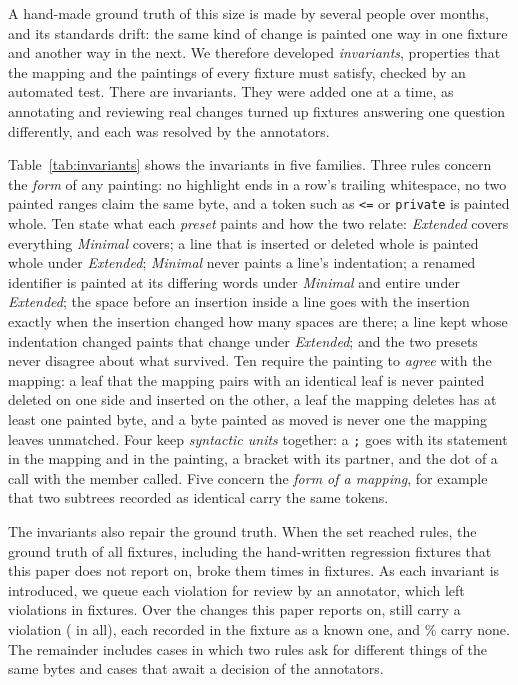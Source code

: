 \documentclass[sigconf,review]{acmart}
\begin{document}
A hand-made ground truth of this size is made by several people over months, and its standards
drift: the same kind of change is painted one way in one fixture and another way in the next. We
therefore developed \emph{invariants}, properties that the mapping and the paintings of every
fixture must satisfy, checked by an automated test. There are
\InvariantCount{} invariants. They were added one at a time, as annotating and reviewing real
changes turned up fixtures answering one question differently, and each was resolved by the
annotators.



Table~\ref{tab:invariants} shows the invariants in five families. Three rules concern the \emph{form} of any painting:
no highlight ends in a row's trailing whitespace, no two painted ranges claim the same byte, and
a token such as \texttt{<=} or \texttt{private} is painted whole. Ten state what each
\emph{preset} paints and how the two relate: \emph{Extended} covers everything \emph{Minimal}
covers; a line that is inserted or deleted whole is painted whole under \emph{Extended};
\emph{Minimal} never paints a line's indentation; a renamed identifier is painted at its differing
words under \emph{Minimal} and entire under \emph{Extended}; the space before an insertion inside a
line goes with the insertion exactly when the insertion changed how many spaces are there; a line
kept whose indentation changed paints that change under \emph{Extended}; and the two presets never
disagree about what survived. Ten require the painting to \emph{agree} with the
mapping: a leaf that the mapping pairs with an identical leaf is never painted deleted on one
side and inserted on the other, a leaf the mapping deletes has at least one painted byte, and a
byte painted as moved is never one the mapping leaves unmatched. Four keep \emph{syntactic units}
together: a \texttt{;} goes with its statement in the mapping and in the painting, a bracket with
its partner, and the dot of a call with the member called. Five concern the \emph{form of a
mapping}, for example that two subtrees recorded as identical carry the same tokens.

The invariants also repair the ground truth. When the set reached \InvariantRepairRuleCount{} rules, the
ground truth of all fixtures, including the hand-written regression fixtures that this paper
does not report on, broke them \InvariantRepairBeforeViolations{} times in
\InvariantRepairBeforeFixtures{} fixtures. As each invariant is introduced, we queue each
violation for review by an annotator, which left \InvariantRepairAfterViolations{}
violations in \InvariantRepairAfterFixtures{} fixtures. Over the \InvariantHumanAllScored{}
changes this paper reports on, \InvariantHumanAllFixtures{} still carry a violation
(\InvariantHumanAllViolations{} in all), each recorded in the fixture as a known one, and
\InvariantHumanAllCleanPct{}\% carry none. The remainder includes cases in which two rules ask for
different things of the same bytes and cases that await a decision of the annotators.
\end{document}
